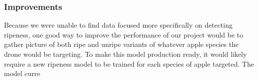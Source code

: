 \subsubsection{Improvements}
Because we were unable to find data focused more specifically on detecting ripeness, 
one good way to improve the performance of our project would be to gather picture of both ripe and unripe variants of whatever apple species the drone would be targeting. 
To make this model production ready, it would likely require a new ripeness model to be trained for each species of apple targeted.
The model curre
